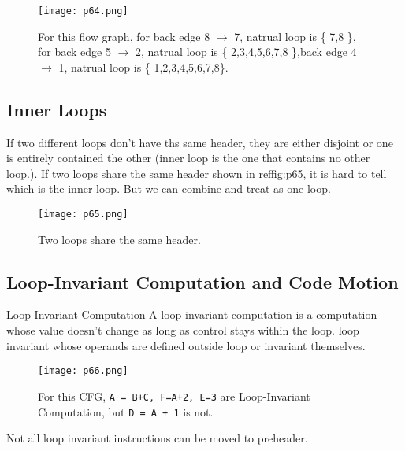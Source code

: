 \begin{figure}[H]
    \centering
     \texttt{[image: p64.png]}
         \caption{For this flow graph, for back edge 8 $\rightarrow$ 7, natrual loop is \{ 7,8 \}, for back edge 5 $\rightarrow$ 2, natrual loop is \{ 2,3,4,5,6,7,8 \},back edge 4 $\rightarrow$ 1, natrual loop is \{ 1,2,3,4,5,6,7,8\}.}
         \label{fig:p64}
\end{figure}

\subsection{Inner Loops}

If two different loops don't have ths same header, they are either disjoint or one is entirely contained the other (inner loop is the one that contains no other loop.).
If two loops share the same header shown in ref{fig:p65}, it is hard to tell which is the inner loop. But we can combine and treat as one loop.


\begin{figure}[H]
    \centering
     \texttt{[image: p65.png]}
         \caption{Two loops share the same header.}
         \label{fig:p65}
\end{figure}






\subsection{Loop-Invariant Computation and Code Motion}

\begin{definition}{Loop-Invariant Computation}
    A loop-invariant computation is a computation whose value doesn't change as long as control stays within the loop. 
    loop invariant whose operands are defined outside loop or invariant themselves.
\end{definition}


\begin{figure}[H]
    \centering
     \texttt{[image: p66.png]}
         \caption{For this CFG, \texttt{A = B+C, F=A+2, E=3} are Loop-Invariant Computation, but \texttt{D = A + 1} is not. }
         \label{fig:p66}
\end{figure}



Not all loop invariant instructions can be moved to preheader.


